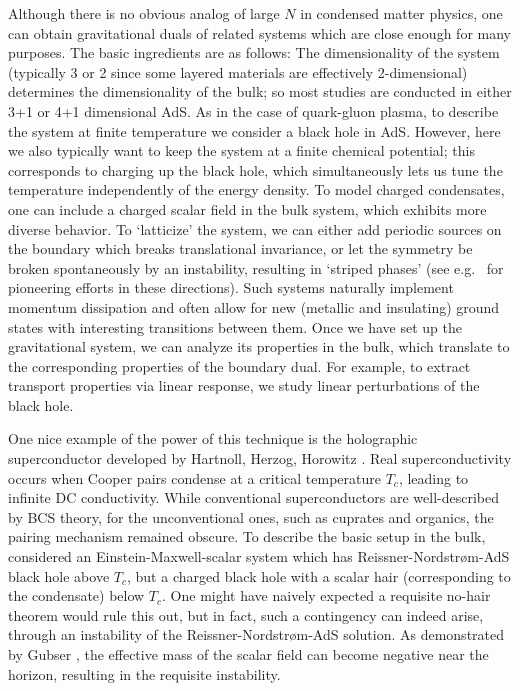 \documentclass[12pt]{article}
\def\RN{Reissner-Nordstr\o m}
\begin{document}
Although there is no obvious analog of large $N$ in condensed matter physics, one can obtain gravitational duals of  related  systems which are close enough for many purposes.  The basic ingredients are as follows:  The dimensionality of the system (typically 3 or 2 since some layered materials are effectively 2-dimensional) determines the dimensionality of the bulk; so most studies are conducted in either 3+1 or 4+1 dimensional AdS.  As in the case of quark-gluon plasma, to describe the system at finite temperature we consider a black hole in AdS.  However, here we also typically want to keep the system at a finite chemical potential; this corresponds to charging up the black hole, which simultaneously lets us tune the temperature independently of the energy density.  To model charged condensates, one can include a charged scalar field in the bulk system, which exhibits more diverse behavior.   To `latticize' the system, we can either add periodic sources on the boundary which breaks translational invariance, or let the symmetry be broken spontaneously by an instability, resulting in `striped phases' (see e.g.\  \cite{Horowitz:2012ky,Donos:2011bh} for pioneering efforts in these directions).  Such systems naturally implement momentum dissipation and often allow for new (metallic and insulating) ground states with interesting transitions between them.
Once we have set up the gravitational system, we can analyze its properties in the bulk, which translate to the corresponding properties of the boundary dual.   For example, to extract transport properties via linear response, we study linear perturbations of the black hole. 

One nice example of the power of this technique is the holographic superconductor developed by Hartnoll, Herzog, Horowitz \cite{Hartnoll:2008vx}.  Real superconductivity occurs when Cooper pairs condense at a critical temperature $T_c$, leading to infinite DC conductivity.  While conventional superconductors are well-described by BCS theory, for the unconventional ones, such as cuprates and organics, the pairing mechanism remained obscure.
To describe the basic setup in the bulk, \cite{Hartnoll:2008vx} considered an Einstein-Maxwell-scalar system which has \RN-AdS black hole above $T_c$, but a charged black hole with a scalar hair (corresponding to the condensate) below $T_c$.  One might have naively expected a requisite no-hair theorem would rule this out, but in fact, such a contingency can indeed arise, through an instability of the \RN-AdS solution.  As demonstrated by Gubser \cite{Gubser:2008px}, the effective mass of the scalar field can become negative near the horizon, resulting in the requisite instability.
\end{document}
